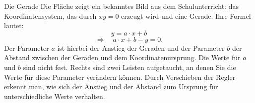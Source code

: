 \begin{surferPage}[Gerade]{Die Gerade}
Die Fläche zeigt ein bekanntes Bild aus dem Schulunterricht: das Koordinatensystem, das durch $xy=0$ erzeugt wird und eine Gerade. Ihre Formel lautet:
\[y=a\cdot x + b\]
\[ \Rightarrow \quad a\cdot x +b -y=0.\]
Der Parameter $a$ ist hierbei der Anstieg der Geraden und der Parameter $b$ der Abstand zwischen der Geraden und dem Koordinatenursprung.
\newline \newline
Die Werte für $a$ und $b$ sind nicht fest. Rechts sind zwei Leisten aufgetaucht, an denen Sie die Werte für diese Parameter verändern können. Durch Verschieben der Regler erkennt man, wie sich der Anstieg und der Abstand zum Ursprung für unterschiedliche Werte verhalten.
\end{surferPage}
